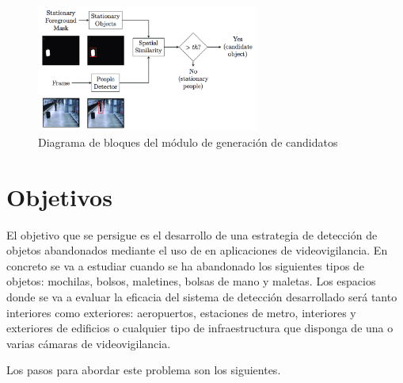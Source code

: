 \begin{figure}[ht]
\centering
\includegraphics[width=0.65\textwidth]{img/chapters/introduccion/Block-diagram-Stationary-detection.png}
\caption{\label{fig:diagram-stationary-detection}Diagrama de bloques del módulo de generación de candidatos}
\end{figure}

\section{Objetivos}
\label{sec:objetivos}

El objetivo que se persigue es el desarrollo de una estrategia de detección de objetos abandonados mediante el uso de \cite{confusion-matrix} en aplicaciones de videovigilancia. En concreto se va a estudiar cuando se ha abandonado los siguientes tipos de objetos: mochilas, bolsos, maletines, bolsas de mano y maletas. Los espacios donde se va a evaluar la eficacia del sistema de detección desarrollado será tanto interiores como exteriores: aeropuertos, estaciones de metro, interiores y exteriores de edificios o cualquier tipo de infraestructura que disponga de una o varias cámaras de videovigilancia.

Los pasos para abordar este problema son los siguientes.

